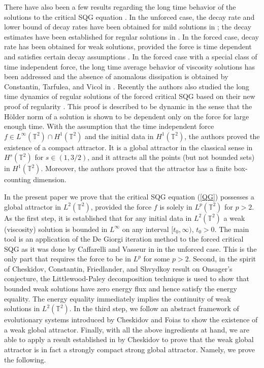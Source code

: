 \documentclass{amsart}
\numberwithin{Theorem}{section}
\theoremstyle{definition}
\theoremstyle{remark}
\begin{document}
There have also been a few results regarding the long time behavior of the solutions to the critical SQG equation \cite{CTVan, CTV, Don, SS03, SS05}. In the unforced case, the decay rate and lower bound of decay rates have been obtained for mild solutions in \cite{SS05}; the decay estimates have been established for regular solutions in \cite{Don}. In the forced case, decay rate has been obtained for weak solutions, provided the force is time dependent and satisfies certain decay assumptions \cite{SS03}. In the forced case with a special class of time independent force, the long time average behavior of viscosity solutions has been addressed and the absence of anomalous dissipation is obtained by Constantin, Tarfulea, and Vicol in \cite{CTVan}. Recently the authors also studied the long time dynamics of regular solutions of the forced critical SQG based on their new proof of regularity \cite{CTV}. This proof is described to be dynamic in the sense that the H\"older norm of a solution is shown to be dependent
only on the force for
large enough time. With the assumption that the time independent force $f\in L^\infty(\mathbb T^2)\cap H^1(\mathbb T^2)$ and the initial data in $H^1(\mathbb T^2)$, the authors proved the existence of a compact attractor. It is a global attractor in the
classical sense in $H^s(\mathbb T^2)$ for $s\in(1,3/2)$, and it attracts all the points (but not bounded sets) in $H^1(\mathbb T^2)$. 
Moreover, the authors proved that the attractor has a finite box-counting dimension.

In the present paper we prove that the critical SQG equation (\ref{QG}) possesses a global attractor in
$L^2(\mathbb T^2)$, provided the force $f$ is solely in $L^p(\mathbb T^2)$ for $p>2$. As the first step, it is established that for any initial data in $L^2(\mathbb T^2)$ a weak (viscosity) solution is bounded in $L^\infty$ on any interval $[t_0, \infty)$, $t_0>0$. The main tool is an application of the De Giorgi iteration method to the forced critical SQG as it was done by Caffarelli and Vasseur in \cite{CaV} in the unforced case. This is the only 
part that requires the force to be in $L^p$ for some $p>2$. Second, in the spirit of Cheskidov, Constantin, Friedlander, and Shvydkoy 
result \cite{CCFS} on Onsager's conjecture, the Littlewood-Paley decomposition technique is used to show that bounded weak solutions have zero energy flux and hence satisfy the energy equality. The energy equality immediately implies the continuity of weak solutions in $L^2(\mathbb T^2)$. In the third step, we follow an abstract framework of evolutionary systems introduced by Cheskidov and Foias \cite{CF} to show the existence of a weak
global attractor. Finally, with all the above ingredients at hand, we are able to apply a result established in \cite{C5} by Cheskidov to prove that the
weak global attractor is in fact a strongly compact strong global attractor. Namely, we prove the following.
\end{document}
